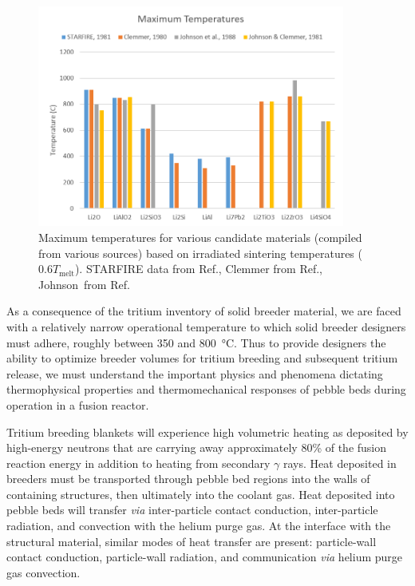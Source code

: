 \begin{figure}[ht]
	\centering
	\includegraphics[width=0.9\textwidth]{figures/Tmax} 
	\caption{Maximum temperatures for various candidate materials (compiled from various sources) based on irradiated sintering temperatures ($0.6T_\text{melt}$). STARFIRE data from Ref.\cite{Johnson1981}, Clemmer from Ref.\cite{Clemmer1980}, Johnson\etal~from Ref.\cite{Johnson1988}}
	\label{fig:Tmax}
\end{figure}

As a consequence of the tritium inventory of solid breeder material, we are faced with a relatively narrow operational temperature to which solid breeder designers must adhere, roughly between 350 and \SI{800}{\celsius}. Thus to provide designers the ability to optimize breeder volumes for tritium breeding and subsequent tritium release, we must understand the important physics and phenomena dictating thermophysical properties and thermomechanical responses of pebble beds during operation in a fusion reactor. 



Tritium breeding blankets will experience high volumetric heating as deposited by high-energy neutrons that are carrying away approximately 80\% of the fusion reaction energy in addition to heating from secondary $\gamma$ rays. Heat deposited in breeders must be transported through pebble bed regions into the walls of containing structures, then ultimately into the coolant gas. Heat deposited into pebble beds will transfer \textit{via} inter-particle contact conduction, inter-particle radiation, and convection with the helium purge gas. At the interface with the structural material, similar modes of heat transfer are present: particle-wall contact conduction, particle-wall radiation, and communication \textit{via} helium purge gas convection. 

